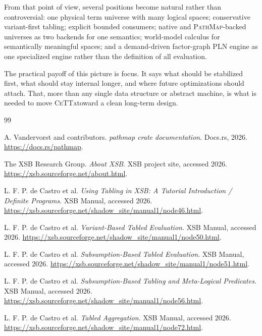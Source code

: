 \documentclass[11pt]{article}
\newcommand{\CeTTa}{\textsc{CeTTa}}
\newcommand{\PathMap}{\textsc{PathMap}}
\begin{document}
From that point of view, several positions become natural rather than controversial: one physical term universe with many logical spaces; conservative variant-first tabling; explicit bounded consumers; native and \PathMap-backed universes as two backends for one semantics; world-model calculus for semantically meaningful spaces; and a demand-driven factor-graph PLN engine as one specialized engine rather than the definition of all evaluation.

The practical payoff of this picture is focus. It says what should be stabilized first, what should stay internal longer, and where future optimizations should attach. That, more than any single data structure or abstract machine, is what is needed to move \CeTTa toward a clean long-term design.

\begin{thebibliography}{99}

A. Vandervorst and contributors.
\newblock \emph{pathmap crate documentation}.
\newblock Docs.rs, 2026.
\newblock \url{https://docs.rs/pathmap}.

The XSB Research Group.
\newblock \emph{About XSB}.
\newblock XSB project site, accessed 2026.
\newblock \url{https://xsb.sourceforge.net/about.html}.

L. F. P. de Castro et al.
\newblock \emph{Using Tabling in XSB: A Tutorial Introduction / Definite Programs}.
\newblock XSB Manual, accessed 2026.
\newblock \url{https://xsb.sourceforge.net/shadow_site/manual1/node46.html}.

L. F. P. de Castro et al.
\newblock \emph{Variant-Based Tabled Evaluation}.
\newblock XSB Manual, accessed 2026.
\newblock \url{https://xsb.sourceforge.net/shadow_site/manual1/node50.html}.

L. F. P. de Castro et al.
\newblock \emph{Subsumption-Based Tabled Evaluation}.
\newblock XSB Manual, accessed 2026.
\newblock \url{https://xsb.sourceforge.net/shadow_site/manual1/node51.html}.

L. F. P. de Castro et al.
\newblock \emph{Subsumption-Based Tabling and Meta-Logical Predicates}.
\newblock XSB Manual, accessed 2026.
\newblock \url{https://xsb.sourceforge.net/shadow_site/manual1/node56.html}.

L. F. P. de Castro et al.
\newblock \emph{Tabled Aggregation}.
\newblock XSB Manual, accessed 2026.
\newblock \url{https://xsb.sourceforge.net/shadow_site/manual1/node72.html}.


\end{thebibliography}
\end{document}
